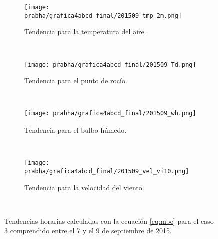 \begin{figure}[H]
    \centering
    \begin{subfigure}[b]{0.45\textwidth}
        \caption{Tendencia para la temperatura del aire.}
	\texttt{[image: prabha/grafica4abcd\_final/201509\_tmp\_2m.png]}
    \label{subfig:tmp_0_caso4}
	\end{subfigure}
	~
	    \begin{subfigure}[b]{0.45\textwidth}
	        \caption{Tendencia para el punto de rocío.}
	\texttt{[image: prabha/grafica4abcd\_final/201509\_Td.png]}

    \label{subfig:td_caso4}
	\end{subfigure}
	~
	    \begin{subfigure}[b]{0.45\textwidth}
	\caption{Tendencia para el bulbo húmedo.}
	\texttt{[image: prabha/grafica4abcd\_final/201509\_wb.png]}
    \label{subfig:wb_caso4}
	\end{subfigure}
	~
	    \begin{subfigure}[b]{0.45\textwidth}
	\caption{Tendencia para la velocidad del viento.}	
	\texttt{[image: prabha/grafica4abcd\_final/201509\_vel\_vi10.png]}
    
    \label{subfig:vel_caso4}
	\end{subfigure}
	~

\caption{Tendencias horarias calculadas con la ecuación \ref{eq:mbe} para el caso 3 comprendido entre el 7 y el 9 de septiembre de 2015.}	
\label{subfig:mbe_caso4}	
\end{figure}


